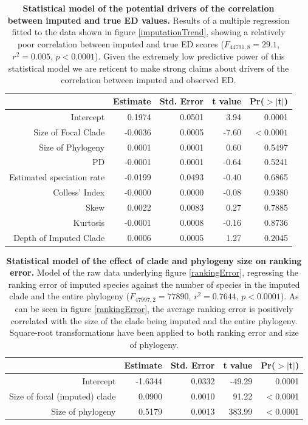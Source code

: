\documentclass[10pt,english]{article}
\begin{document}
\begin{table}[ht] 
  \centering
  \begin{tabular}{rrrrr}
    \hline
    & Estimate & Std. Error & t value & Pr($>$$|$t$|$) \\
     \hline
     Intercept & 0.1974 & 0.0501 & 3.94 & 0.0001 \\
     Size of Focal Clade & -0.0036 & 0.0005 & -7.60 & $<0.0001$ \\
     Size of Phylogeny & 0.0001 & 0.0001 & 0.60 & 0.5497 \\
     PD & -0.0001 & 0.0001 & -0.64 & 0.5241 \\
     Estimated speciation rate & -0.0199 & 0.0493 & -0.40 & 0.6865 \\
     Colless' Index & -0.0000 & 0.0000 & -0.08 & 0.9380 \\
     Skew & 0.0022 & 0.0083 & 0.27 & 0.7885 \\
     Kurtosis & -0.0001 & 0.0008 & -0.16 & 0.8736 \\
     Depth of Imputed Clade & 0.0006 & 0.0005 & 1.27 & 0.2045 \\ \hline
  \end{tabular}
  \caption{\textbf{Statistical model of the potential drivers of the correlation
      between imputed and true ED values.} Results of a multiple regression
      fitted to the data shown in figure \ref{imputationTrend}, showing a
      relatively poor correlation between imputed and true ED scores
      ($F_{44791,8} = 29.1$, $r^{2} = 0.005$, $p < 0.0001$). Given the extremely
      low predictive power of this statistical model we are reticent to make
      strong claims about drivers of the correlation between imputed and
      observed ED.}
  \label{impute_reg}
\end{table}

\begin{table}[ht]
  \centering
  \begin{tabular}{rrrrr}
    \hline
   & Estimate & Std. Error & t value & Pr($>$$|$t$|$) \\ \hline
    Intercept & -1.6344 & 0.0332 & -49.29 & 0.0001 \\
    Size of focal (imputed) clade & 0.0900 & 0.0010 & 91.22 & $<$0.0001 \\
    Size of phylogeny & 0.5179 & 0.0013 & 383.99 & $<$0.0001 \\ \hline
  \end{tabular}
  \caption{\textbf{Statistical model of the effect of clade and phylogeny size
      on ranking error.} Model of the raw data underlying figure
      \ref{rankingError}, regressing the ranking error of imputed species
      against the number of species in the imputed clade and the entire
      phylogeny ($F_{47997,2} = 77890$, $r^2 = 0.7644$, $p < 0.0001$). As can be
      seen in figure \ref{rankingError}, the average ranking error is positively
      correlated with the size of the clade being imputed and the entire
      phylogeny. Square-root transformations have been applied to both ranking
      error and size of phylogeny.}
  \label{impute_rank}
\end{table}
\end{document}
